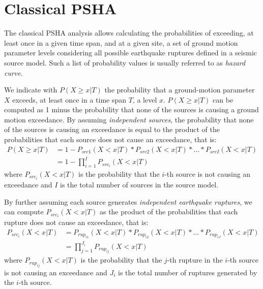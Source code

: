 \section{Classical PSHA}
The classical PSHA analysis allows calculating the probabilities of exceeding,
at least once in a given time span, and at a given site, a set of ground motion
parameter levels considering all possible earthquake ruptures defined in a
seismic source model. Such a list of probability values is usually referred to
as \textit{hazard curve}.

We indicate with $P(X \ge x | T)$ the probability that a ground-motion parameter
$X$ exceeds, at least once in a time span $T$, a level $x$. $P(X \ge x | T)$ can
be computed as 1 minus the probability that none of the sources is causing a
ground motion exceedance. By assuming \textit{independent sources}, the
probability that none of the sources is causing an exceedance is equal to the
product of the probabilities that each source does not cause an exceedance, that
is:
\begin{align}
\label{eq:hazard_eq}
P(X \ge x | T) & =  1 - P_{src1}(X < x | T) * P_{src2}(X < x | T) * ... * P_{srcI}(X < x | T) \nonumber \\
		      & =  1 - \prod_{i=1}^{I} P_{src_{i}}(X < x | T)
\end{align}
where $P_{src_{i}}(X < x | T)$ is the probability that the $i$-th source is not
causing an exceedance and $I$ is the total number of sources in the source
model.

By further assuming each source generates \textit{independent earthquake
ruptures}, we can compute $P_{src_{i}}(X < x | T)$ as the product of the
probabilities that each rupture does not cause an exceedance, that is:
\begin{align}
\label{eq:prup_noexceed_src}
P_{src_{i}}(X < x | T) & = P_{rup_{i1}}(X < x | T) * P_{rup_{i2}}(X < x | T) * ... * P_{rup_{iJ}}(X < x | T) \nonumber \\
			        & = \prod_{j=1}^{J_{i}} P_{rup_{ij}}(X < x | T)
\end{align}
where $P_{rup_{ij}}(X < x | T)$ is the probability that the $j$-th rupture in the $i$-th source is not causing an exceedance and $J_{i}$ is
the total number of ruptures generated by the $i$-th source.

